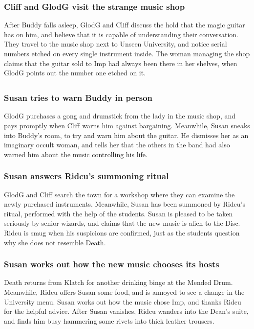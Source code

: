 \subsubsection{\Gls{Cliff} and \Gls{GlodG} visit the strange music shop}
After \Gls{Buddy} falls asleep, \Gls{GlodG} and \Gls{Cliff} discuss the hold that the magic guitar
has on him, and believe that it is capable of understanding their conversation. They travel to the
music shop next to Unseen University, and notice serial numbers etched on every single instrument
inside. The woman managing the shop claims that the guitar sold to \Gls{Imp} had always been there
in her shelves, when \Gls{GlodG} points out the number one etched on it.

\subsection{}
\subsubsection{\Gls{Susan} tries to warn \Gls{Buddy} in person}
\Gls{GlodG} purchases a gong and drumstick from the lady in the music shop, and pays promptly when
\Gls{Cliff} warns him against bargaining. Meanwhile, \Gls{Susan} sneaks into \Gls{Buddy}'s room,
to try and warn him about the guitar. He dismisses her as an imaginary occult woman, and tells her
that the others in the band had also warned him about the music controlling his life.

\subsubsection{\Gls{Susan} answers \Gls{Ridcu}'s summoning ritual}
\Gls{GlodG} and \Gls{Cliff} search the town for a workshop where they can examine the newly
purchased instruments. Meanwhile, \Gls{Susan} has been summoned by \Gls{Ridcu}'s ritual, performed
with the help of the students. \Gls{Susan} is pleased to be taken seriously by senior wizards, and
claims that the new music is alien to the Disc. \Gls{Ridcu} is smug when his suspicions are
confirmed, just as the students question why she does not resemble \Gls{Death}.

\subsubsection{\Gls{Susan} works out how the new music chooses its hosts}
\Gls{Death} returns from Klatch for another drinking binge at the Mended Drum. Meanwhile,
\Gls{Ridcu} offers \Gls{Susan} some food, and is annoyed to see a change in the University menu.
\Gls{Susan} works out how the music chose \Gls{Imp}, and thanks \Gls{Ridcu} for the helpful advice.
After \Gls{Susan} vanishes, \Gls{Ridcu} wanders into the \Gls{Dean}'s suite, and finds him busy
hammering some rivets into thick leather trousers.

